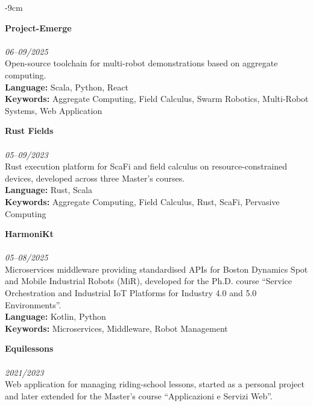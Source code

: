 \documentclass[10pt,a4paper]{altacv}
\begin{document}
\begin{adjustwidth}{}{-9cm}
    \divider

    \textcolor{accent}{\textbf{Project-Emerge}}\\
    \\
    \textit{06--09/2025}\\ \smallskip
    Open-source toolchain for multi-robot demonstrations based on aggregate computing.\\ \smallskip
    \textbf{Language:} Scala, Python, React\\
    \textbf{Keywords:} Aggregate Computing, Field Calculus, Swarm Robotics, Multi-Robot Systems, Web Application
    
    \divider

    \textcolor{accent}{\textbf{Rust Fields}}\\
    \\
    \textit{05--09/2023}\\ \smallskip
    Rust execution platform for ScaFi and field calculus on resource-constrained devices, developed across three Master's courses.\\ \smallskip
    \textbf{Language:} Rust, Scala\\
    \textbf{Keywords:} Aggregate Computing, Field Calculus, Rust, ScaFi, Pervasive Computing

    \divider

    \textcolor{accent}{\textbf{HarmoniKt}}\\
    \\
    \textit{05--08/2025}\\ \smallskip
    Microservices middleware providing standardised APIs for Boston Dynamics Spot and Mobile Industrial Robots (MiR),
    developed for the Ph.D. course ``Service Orchestration and Industrial IoT Platforms for Industry 4.0 and 5.0 Environments''.\\ \smallskip
    \textbf{Language:} Kotlin, Python\\
    \textbf{Keywords:} Microservices, Middleware, Robot Management

    \divider


    \textcolor{accent}{\textbf{Equilessons}}\\
    \\
    \textit{2021/2023}\\ \smallskip
    Web application for managing riding-school lessons, started as a personal project and later
    extended for the Master's course ``Applicazioni e Servizi Web''.\\ \smallskip
    \smallskip


\end{adjustwidth}
\end{document}
